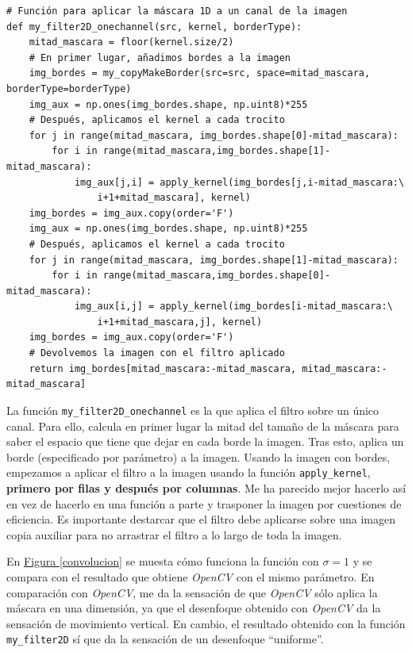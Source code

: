 \documentclass[11pt,a4paper]{article}
\theoremstyle{plain}
\theoremstyle{definition}
\begin{document}
\begin{verbatim}
# Función para aplicar la máscara 1D a un canal de la imagen
def my_filter2D_onechannel(src, kernel, borderType):
    mitad_mascara = floor(kernel.size/2)
    # En primer lugar, añadimos bordes a la imagen
    img_bordes = my_copyMakeBorder(src=src, space=mitad_mascara, borderType=borderType)
    img_aux = np.ones(img_bordes.shape, np.uint8)*255
    # Después, aplicamos el kernel a cada trocito
    for j in range(mitad_mascara, img_bordes.shape[0]-mitad_mascara):
        for i in range(mitad_mascara,img_bordes.shape[1]-mitad_mascara):
            img_aux[j,i] = apply_kernel(img_bordes[j,i-mitad_mascara:\
                i+1+mitad_mascara], kernel)
    img_bordes = img_aux.copy(order='F')
    img_aux = np.ones(img_bordes.shape, np.uint8)*255
    # Después, aplicamos el kernel a cada trocito
    for j in range(mitad_mascara, img_bordes.shape[1]-mitad_mascara):
        for i in range(mitad_mascara,img_bordes.shape[0]-mitad_mascara):
            img_aux[i,j] = apply_kernel(img_bordes[i-mitad_mascara:\
                i+1+mitad_mascara,j], kernel)
    img_bordes = img_aux.copy(order='F')
    # Devolvemos la imagen con el filtro aplicado
    return img_bordes[mitad_mascara:-mitad_mascara, mitad_mascara:-mitad_mascara]
\end{verbatim}

La función \texttt{my\_filter2D\_onechannel} es la que aplica el filtro sobre un único canal. Para ello, calcula en primer lugar la mitad del tamaño de la máscara para saber el espacio que tiene que dejar en cada borde la imagen. Tras esto, aplica un borde (especificado por parámetro) a la imagen. Usando la imagen con bordes, empezamos a aplicar el filtro a la imagen usando la función \texttt{apply\_kernel}, \textbf{primero por filas y después por columnas}. Me ha parecido mejor hacerlo así en vez de hacerlo en una función a parte y trasponer la imagen por cuestiones de eficiencia. Es importante destarcar que el filtro debe aplicarse sobre una imagen copia auxiliar para no arrastrar el filtro a lo largo de toda la imagen.

En \hyperref[convolucion]{Figura \ref*{convolucion}} se muesta cómo funciona la función con $\sigma = 1$ y se compara con el resultado que obtiene \textit{OpenCV} con el mismo parámetro. En comparación con \textit{OpenCV}, me da la sensación de que \textit{OpenCV} sólo aplica la máscara en una dimensión, ya que el desenfoque obtenido con \textit{OpenCV} da la sensación de movimiento vertical. En cambio, el resultado obtenido con la función \texttt{my\_filter2D} sí que da la sensación de un desenfoque ``uniforme''.
\end{document}
